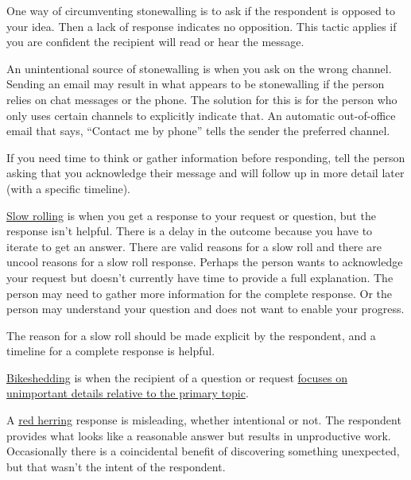 One way of circumventing stonewalling is to ask if the respondent is opposed to your idea. 
Then a lack of response indicates no opposition. This tactic applies if you are confident the recipient will read or hear the message.

An unintentional source of stonewalling is when you ask on the wrong channel. Sending an email may result in what appears to be stonewalling if the person relies on chat messages or the phone. The solution for this 
is for the person who only uses certain channels to explicitly indicate that. An automatic out-of-office email that says, ``Contact me by phone'' tells the sender the preferred channel.

If you need time to think or gather information before responding, 
tell the person asking that you acknowledge their message and will follow up in more detail later (with a specific timeline). 

\underline{Slow rolling} is when you get a response to your request or question, but the response isn't helpful. There is a delay in the outcome because you have to iterate to get an answer. There are valid reasons for a slow roll and there are uncool reasons for a slow roll response. Perhaps the person wants to acknowledge your request but doesn't currently have time to provide a full explanation. The person may need to gather more information for the complete response. Or the person may understand your question and does not want to enable your progress. 

The reason for a slow roll should be made explicit by the respondent, 
and a timeline for a complete response is helpful. 

\underline{Bikeshedding} is when the recipient of a question or request \href{https://en.wikipedia.org/wiki/Law_of_triviality}{focuses on unimportant details relative to the primary topic}. 

A \underline{red herring} response is misleading, whether intentional or not. The respondent provides what looks like a reasonable answer but results in unproductive work. Occasionally there is a coincidental benefit of discovering something unexpected, but that wasn't the intent of the respondent. 


